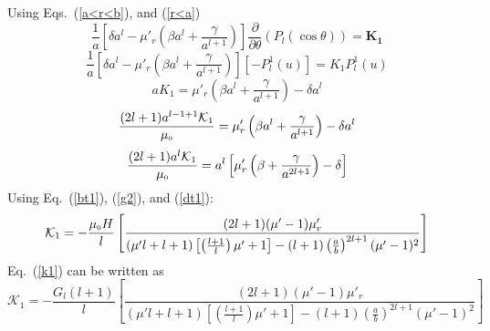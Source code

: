 Using Eqs.~(\ref{a<r<b}), and (\ref{r<a})
$$\frac{1}{a}\left[\delta a^l-\mu'_r\left(\beta a^l+\frac{\gamma}{a^{l+1}}\right)\right]\frac{\partial}{\partial \theta}(P_l(\cos\theta))= \bm{K_1}$$
$$\frac{1}{a}\left[\delta a^l-\mu'_r\left(\beta a^l+\frac{\gamma}{a^{l+1}}\right)\right][-P_l^1(u)]= K_1 P_l^1(u)$$
$$a K_1=\mu'_r\left(\beta a^l+\frac{\gamma}{a^{l+1}}\right)-\delta a^l$$
$$\frac{(2l+1)a^{l-1+1}\mathcal{K}_1}{\mu_{\scriptscriptstyle 0}}=\mu'_r\left(\beta a^l+\frac{\gamma}{a^{l+1}}\right)-\delta a^l$$
$$\frac{(2l+1)a^l\mathcal{K}_1}{\mu_{\scriptscriptstyle 0}}=a^l\left[\mu'_r\left(\beta +\frac{\gamma}{a^{2l+1}}\right)-\delta \right]$$
Using Eq.~(\ref{bt1}), (\ref{g2}), and (\ref{dt1}):
\begin{equation}\label{k1s}
\mathcal{K}_1=-\frac{\mu_{\scriptscriptstyle 0} H}{l}\left[\frac{(2l+1)(\mu'-1)\mu'_r}{(\mu'l+l+1)\left[\left(\frac{l+1}{l}\right)\mu'+1\right]-(l+1)\left(\frac{a}{b}\right)^{2l+1}(\mu'-1)^2}\right]
\end{equation}
Eq.~(\ref{k1}) can be written as
\begin{equation}\label{k1b}
\mathcal{K}_1=-\frac{G_l (l+1)}{l}\left[\frac{(2l+1)(\mu'-1)\mu'_r}{(\mu'l+l+1)\left[\left(\frac{l+1}{l}\right)\mu'+1\right]-(l+1)\left(\frac{a}{b}\right)^{2l+1}(\mu'-1)^2}\right]
\end{equation}

